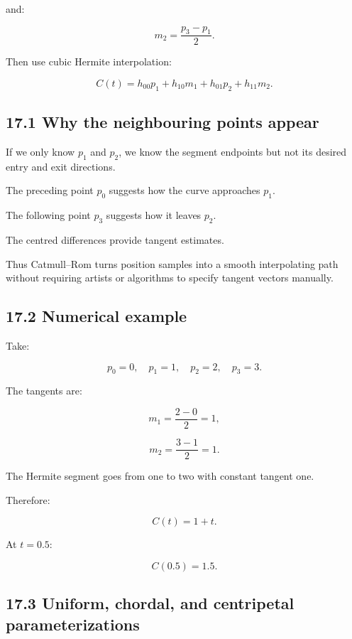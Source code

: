 and:

\[ \boxed{ m_2=\frac{p_3-p_1}{2} }. \]

Then use cubic Hermite interpolation:

\[ \boxed{ C(t)= h_{00}p_1+ h_{10}m_1+ h_{01}p_2+ h_{11}m_2 }. \]

\subsection{17.1 Why the neighbouring points appear}\label{02-foundations-ii-ch028-why-the-neighbouring-points-appear}

\hypertarget{02-foundations-ii-ch028-why-the-neighbouring-points-appear}{}

If we only know \(p_1\) and \(p_2\), we know the segment endpoints but not its desired entry and exit directions.

The preceding point \(p_0\) suggests how the curve approaches \(p_1\).

The following point \(p_3\) suggests how it leaves \(p_2\).

The centred differences provide tangent estimates.

Thus Catmull--Rom turns position samples into a smooth interpolating path without requiring artists or algorithms to specify tangent vectors manually.

\subsection{17.2 Numerical example}\label{02-foundations-ii-ch028-numerical-example-1}

\hypertarget{02-foundations-ii-ch028-numerical-example-1}{}

Take:

\[ p_0=0,\quad p_1=1,\quad p_2=2,\quad p_3=3. \]

The tangents are:

\[ m_1=\frac{2-0}{2}=1, \]

\[ m_2=\frac{3-1}{2}=1. \]

The Hermite segment goes from one to two with constant tangent one.

Therefore:

\[ \boxed{C(t)=1+t}. \]

At \(t=0.5\):

\[ \boxed{C(0.5)=1.5}. \]

\subsection{17.3 Uniform, chordal, and centripetal parameterizations}\label{02-foundations-ii-ch028-uniform-chordal-and-centripetal-parameterizations}

